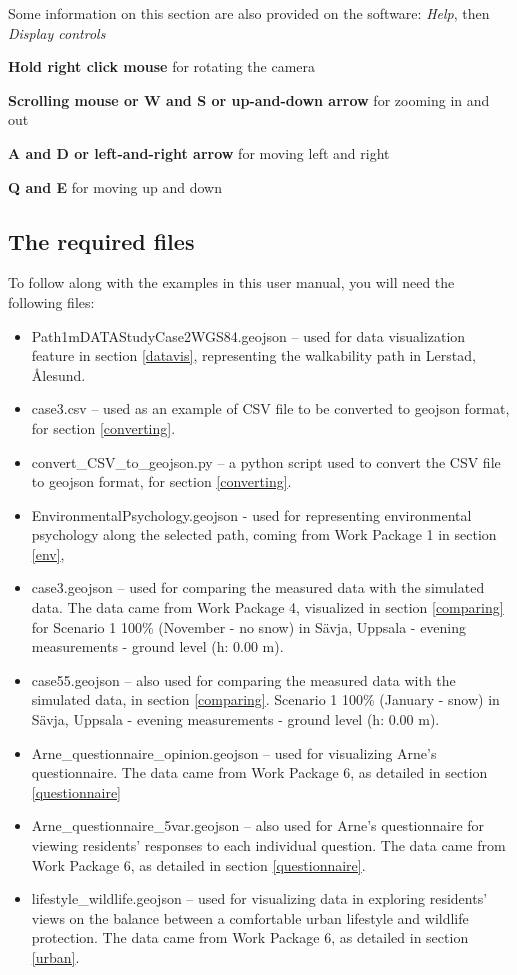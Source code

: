 Some information on this section are also provided on the software: \textit{Help}, then \textit{Display controls}

\textbf{Hold right click mouse} for rotating the camera

\textbf{Scrolling mouse or W and S or up-and-down arrow} for zooming in and out 

\textbf{A and D or left-and-right arrow} for moving left and right

\textbf{Q and E } for moving up and down


\subsection{The required files}
To follow along with the examples in this user manual, you will need the following files:
\begin{itemize}
    \item Path1mDATAStudyCase2WGS84.geojson -- used for data visualization feature in section \ref{datavis}, representing the walkability path in Lerstad, Ålesund. 
    \item case3.csv -- used as an example of CSV file to be converted to geojson format, for section \ref{converting}.
    \item convert\_CSV\_to\_geojson.py -- a python script used to convert the CSV file to geojson format, for section \ref{converting}.
    \item EnvironmentalPsychology.geojson - used for representing environmental psychology along the selected path, coming from Work Package 1 in section \ref{env},
    \item case3.geojson -- used for comparing the measured data with the simulated data. The data came from Work Package 4, visualized in section \ref{comparing} for Scenario 1 100\% (November - no snow) in Sävja, Uppsala - evening measurements - ground level (h: 0.00 m).
    \item case55.geojson -- also used for comparing the measured data with the simulated data, in section \ref{comparing}. Scenario 1 100\% (January - snow) in Sävja, Uppsala - evening measurements - ground level (h: 0.00 m). 
    \item Arne\_questionnaire\_opinion.geojson -- used for visualizing Arne's questionnaire. The data came from Work Package 6, as detailed in section \ref{questionnaire}
    \item Arne\_questionnaire\_5var.geojson -- also used for Arne's questionnaire for viewing residents’ responses to each individual question. The data came from Work Package 6, as detailed in section \ref{questionnaire}.
    \item lifestyle\_wildlife.geojson -- used for visualizing data in exploring residents’ views on the balance between a comfortable urban lifestyle and wildlife protection. The data came from Work Package 6, as detailed in section \ref{urban}.

\end{itemize}


